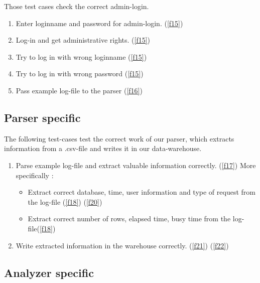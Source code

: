 Those test cases check the correct admin-login.

\begin{enumerate}

\item Enter loginname and password for admin-login. (\ref{f15})

\item Log-in and get administrative rights. (\ref{f15})

\item Try to log in with wrong loginname (\ref{f15})

\item Try to log in with wrong password (\ref{f15})

\item Pass example log-file to the parser (\ref{f16})

\end{enumerate}

\subsection{Parser specific}

The following test-cases test the correct work of our parser, which extracts information from a .csv-file and writes 
it in our data-warehouse.

\begin{enumerate}

\item Parse example log-file and extract valuable information correctly. (\ref{f17}) More specifically :

\begin{itemize}

\item Extract correct database, time, user information and type of request from the log-file (\ref{f18}) (\ref{f20})

\item Extract correct number of rows, elapsed time, busy time from the log-file(\ref{f18})

\end{itemize}

\item Write extracted information in the warehouse correctly. (\ref{f21}) (\ref{f22})

\end{enumerate}


\subsection{Analyzer specific}

